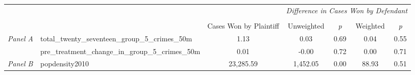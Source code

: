 \begin{tabular}{llccccc}
\toprule
 &  & \textit{} & \multicolumn{4}{c}{\textit{Difference in Cases Won by Defendant}} \\
\cline{4-7}
\\
 &  & Cases Won by Plaintiff & Unweighted & \emph{p} & Weighted & \emph{p} \\
\midrule
\multirow[c]{2}{3cm}{\textit{Panel A}} & total_twenty_seventeen_group_5_crimes_50m & 1.13 & 0.03 & 0.69 & 0.04 & 0.55 \\
 & pre_treatment_change_in_group_5_crimes_50m & 0.01 & -0.00 & 0.72 & 0.00 & 0.71 \\
\cline{1-7}
\textit{Panel B} & popdensity2010 & 23,285.59 & 1,452.05 & 0.00 & 88.93 & 0.51 \\
\cline{1-7}
\bottomrule
\end{tabular}
